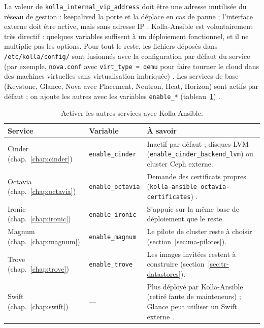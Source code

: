 La valeur de \texttt{kolla\_internal\_vip\_address} doit être une adresse inutilisée du réseau de gestion : keepalived la porte et la
déplace en cas de panne ; l'interface externe doit être active, mais sans adresse IP \parencite{kolla-ansible-quickstart}. Kolla-Ansible
est volontairement très directif : quelques variables suffisent à un déploiement fonctionnel, et il ne multiplie pas les options.
Pour tout le reste, les fichiers déposés dans \texttt{/etc/kolla/config/} sont fusionnés avec la configuration par défaut du service
(par exemple, \texttt{nova.conf} avec \texttt{virt\_type = qemu} pour faire tourner le cloud dans des machines virtuelles sans
virtualisation imbriquée) \parencite{kolla-ansible-philosophy}. Les services de base (Keystone, Glance, Nova avec Placement, Neutron,
Heat, Horizon) sont actifs par défaut ; on ajoute les autres avec les variables \texttt{enable\_*} (tableau~\ref{tab:dep-kolla-services})
\parencite{kolla-ansible-source}.

\begin{table}[!ht]
\centering
\renewcommand{\arraystretch}{1.3}
\begin{tabular}{@{}>{\raggedright\arraybackslash}p{2.6cm}>{\raggedright\arraybackslash}p{3.4cm}>{\raggedright\arraybackslash}p{9.5cm}@{}}
\toprule
\textbf{Service} & \textbf{Variable} & \textbf{À savoir} \\
\midrule
Cinder (chap.~\ref{chap:cinder}) & \texttt{enable\_cinder} & Inactif par défaut ; disques LVM (\texttt{enable\_cinder\_\allowbreak backend\_\allowbreak lvm}) ou cluster Ceph externe. \\
Octavia (chap.~\ref{chap:octavia}) & \texttt{enable\_octavia} & Demande des certificats propres (\texttt{kolla-ansible octavia-certificates}) \parencite{kolla-ansible-source}. \\
Ironic (chap.~\ref{chap:ironic}) & \texttt{enable\_ironic} & S'appuie sur la même base de déploiement que le reste. \\
Magnum (chap.~\ref{chap:magnum}) & \texttt{enable\_magnum} & Le pilote de cluster reste à choisir (section~\ref{sec:ma-pilotes}). \\
Trove (chap.~\ref{chap:trove}) & \texttt{enable\_trove} & Les images invitées restent à construire (section~\ref{sec:tr-datastores}). \\
Swift (chap.~\ref{chap:swift}) & --- & Plus déployé par Kolla-Ansible (retiré faute de mainteneurs) ; Glance peut utiliser un Swift externe \parencite{kolla-ansible-source}. \\
\bottomrule
\end{tabular}
\caption{Activer les autres services avec Kolla-Ansible.}
\label{tab:dep-kolla-services}
\end{table}


